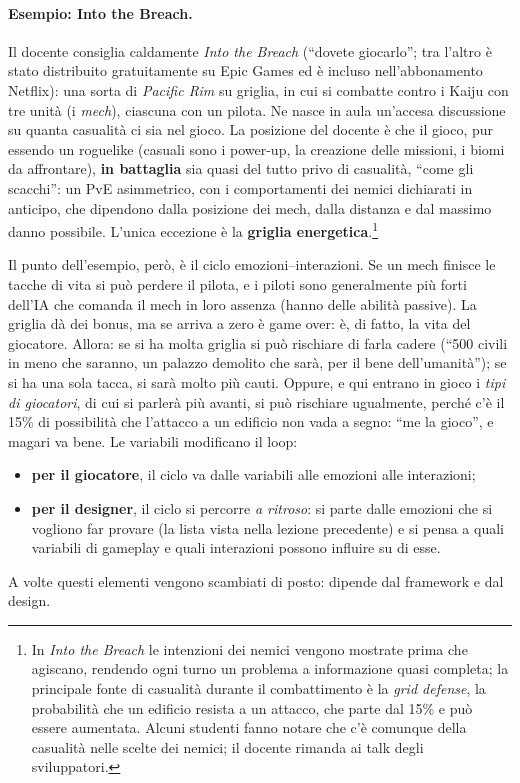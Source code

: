 \paragraph{Esempio: Into the Breach.} Il docente consiglia caldamente
\emph{Into the Breach} (``dovete giocarlo''; tra l'altro è stato distribuito
gratuitamente su Epic Games ed è incluso nell'abbonamento Netflix): una sorta
di \emph{Pacific Rim} su griglia, in cui si combatte contro i Kaiju con tre
unità (i \emph{mech}), ciascuna con un pilota. Ne nasce in aula un'accesa
discussione su quanta casualità ci sia nel gioco. La posizione del docente è
che il gioco, pur essendo un roguelike (casuali sono i power-up, la creazione
delle missioni, i biomi da affrontare), \textbf{in battaglia} sia quasi del
tutto privo di casualità, ``come gli scacchi'': un PvE asimmetrico, con i
comportamenti dei nemici dichiarati in anticipo, che dipendono dalla posizione
dei mech, dalla distanza e dal massimo danno possibile. L'unica eccezione è la
\textbf{griglia energetica}.\footnote{In \emph{Into the Breach} le intenzioni
dei nemici vengono mostrate prima che agiscano, rendendo ogni turno un
problema a informazione quasi completa; la principale fonte di casualità
durante il combattimento è la \emph{grid defense}, la probabilità che un
edificio resista a un attacco, che parte dal 15\% e può essere aumentata.
Alcuni studenti fanno notare che c'è comunque della casualità nelle scelte dei
nemici; il docente rimanda ai talk degli sviluppatori.}

Il punto dell'esempio, però, è il ciclo emozioni--interazioni. Se un mech
finisce le tacche di vita si può perdere il pilota, e i piloti sono
generalmente più forti dell'IA che comanda il mech in loro assenza (hanno
delle abilità passive). La griglia dà dei bonus, ma se arriva a zero è game
over: è, di fatto, la vita del giocatore. Allora: se si ha molta griglia si
può rischiare di farla cadere (``500 civili in meno che saranno, un palazzo
demolito che sarà, per il bene dell'umanità''); se si ha una sola tacca, si
sarà molto più cauti. Oppure, e qui entrano in gioco i \emph{tipi di
giocatori}, di cui si parlerà più avanti, si può rischiare ugualmente, perché
c'è il 15\% di possibilità che l'attacco a un edificio non vada a segno: ``me
la gioco'', e magari va bene. Le variabili modificano il loop:
\begin{itemize}
  \item \textbf{per il giocatore}, il ciclo va dalle variabili alle emozioni
        alle interazioni;
  \item \textbf{per il designer}, il ciclo si percorre \emph{a ritroso}: si
        parte dalle emozioni che si vogliono far provare (la lista vista nella
        lezione precedente) e si pensa a quali variabili di gameplay e quali
        interazioni possono influire su di esse.
\end{itemize}
A volte questi elementi vengono scambiati di posto: dipende dal framework e
dal design.

